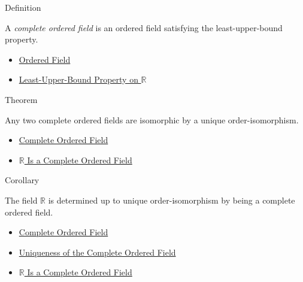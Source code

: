 \begin{definitionbox}{Definition}
\begin{definition}
\label{def:real-ordered-field}
A \emph{complete ordered field} is an ordered field satisfying the
least-upper-bound property.
\end{definition}
\end{definitionbox}

\begin{dependencies}
\begin{itemize}
  \item \hyperref[def:abstract-ordered-field]{Ordered Field}
  \item \hyperref[def:least-upper-bound-property-on-r]{Least-Upper-Bound Property on $\mathbb{R}$}
\end{itemize}
\end{dependencies}

\begin{theorembox}{Theorem}
\begin{theorem}
\label{thm:uniqueness-of-cof}
Any two complete ordered fields are isomorphic by a unique order-isomorphism.
\end{theorem}
\end{theorembox}

\begin{dependencies}
\begin{itemize}
  \item \hyperref[def:real-ordered-field]{Complete Ordered Field}
  \item \hyperref[thm:r-is-complete-ordered-field]{$\mathbb{R}$ Is a Complete Ordered Field}
\end{itemize}
\end{dependencies}

\begin{corollarybox}{Corollary}
\begin{corollary}
\label{cor:r-is-the-reals}
The field $\mathbb{R}$ is determined up to unique order-isomorphism by being a
complete ordered field.
\end{corollary}
\end{corollarybox}

\begin{dependencies}
\begin{itemize}
  \item \hyperref[def:real-ordered-field]{Complete Ordered Field}
  \item \hyperref[thm:uniqueness-of-cof]{Uniqueness of the Complete Ordered Field}
  \item \hyperref[thm:r-is-complete-ordered-field]{$\mathbb{R}$ Is a Complete Ordered Field}
\end{itemize}
\end{dependencies}
